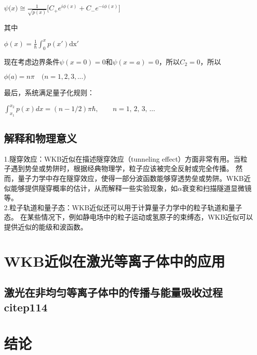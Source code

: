 \documentclass[12pt, a4paper, oneside]{ctexart}
\begin{document}
\begin{spacing}{2.0}
\begin{center}
    $\displaystyle\psi\big(x\big)\cong\frac{1}{\sqrt{p(x)}}\biggl[C_+e^{i\phi(x)}+C_-e^{-i\phi(x)}\biggr]$
\end{center}
其中
\begin{center}
    $\displaystyle \phi(x) = \frac{1}{\hbar}\int_0^xp(x')\mathrm{dx'}$
\end{center}
现在考虑边界条件$\psi(x=0)=0$和$\psi(x=a)=0$，所以$C_2=0$，所以
\begin{center}
    $\phi\bigl(a\bigr)=n\pi\quad\bigl(n=1,2,3,...\bigr)$
\end{center}
最后，系统满足量子化规则：
\begin{center}
    $\displaystyle \int_{x_1}^{x_2} p(x)dx =(n - 1/2)\pi\hbar,\qquad n=1,\,2,\,3,\,\dots\,\!$
\end{center}

\subsection{解释和物理意义}
1.隧穿效应：WKB近似在描述隧穿效应（tunneling effect）方面非常有用。当粒子遇到势垒或势阱时，根据经典物理学，粒子应该被完全反射或完全传播。
然而，量子力学中存在隧穿效应，使得一部分波函数能够穿透势垒或势阱。WKB近似能够提供隧穿概率的估计，从而解释一些实验现象，如$\alpha$衰变和扫描隧道显微镜等。
\\
2.粒子轨道和量子态：WKB近似还可以用于计算量子力学中的粒子轨道和量子态。
在某些情况下，例如静电场中的粒子运动或氢原子的束缚态，WKB近似可以提供近似的能级和波函数。

\section{WKB近似在激光等离子体中的应用}

\subsection{激光在非均匀等离子体中的传播与能量吸收过程citep114}
\subsection{}
\subsection{}
\subsection{}



\section{结论}



\end{spacing}{}
\end{document}
